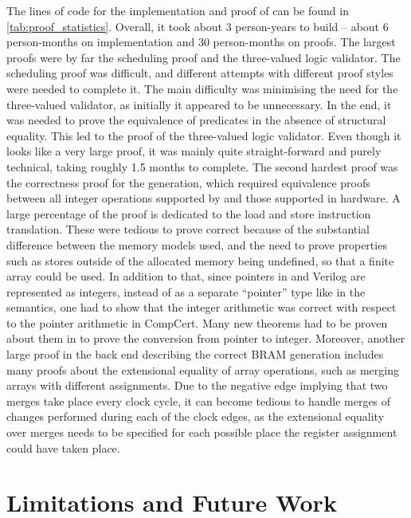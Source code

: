 The lines of code for the implementation and proof of \vericert{} can be found
in \cref{tab:proof_statistics}.  Overall, it took about 3 person-years to build
\vericert{} -- about 6 person-months on implementation and 30 person-months on
proofs.  The largest proofs were by far the scheduling proof and the
three-valued logic validator.  The scheduling proof was difficult, and different
attempts with different proof styles were needed to complete it.  The main
difficulty was minimising the need for the three-valued validator, as initially
it appeared to be unnecessary.  In the end, it was needed to prove the
equivalence of predicates in the absence of structural equality.  This led to
the proof of the three-valued logic validator.  Even though it looks like a very
large proof, it was mainly quite straight-forward and purely technical, taking
roughly 1.5 months to complete.  The second hardest proof was the correctness
proof for the \htl{} generation, which required equivalence proofs between all
integer operations supported by \compcert{} and those supported in hardware.  A
large percentage of the proof is dedicated to the load and store instruction
translation.  These were tedious to prove correct because of the substantial
difference between the memory models used, and the need to prove properties such
as stores outside of the allocated memory being undefined, so that a finite
array could be used. In addition to that, since pointers in \htl{} and Verilog
are represented as integers, instead of as a separate \enquote{pointer} type
like in the \compcert{} semantics, one had to show that the integer arithmetic
was correct with respect to the pointer arithmetic in CompCert.  Many new
theorems had to be proven about them in \vericert{} to prove the conversion from
pointer to integer.  Moreover, another large proof in the back end describing
the correct \gls{BRAM} generation includes many proofs about the extensional
equality of array operations, such as merging arrays with different assignments.
Due to the negative edge implying that two merges take place every clock cycle,
it can become tedious to handle merges of changes performed during each of the
clock edges, as the extensional equality over merges needs to be specified for
each possible place the register assignment could have taken place.

\section{Limitations and Future Work}

